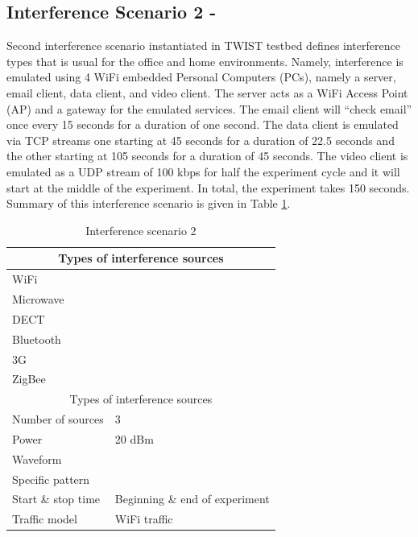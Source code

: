 \documentclass[11pt,a4paper,headinclude,footinclude,chapterprefix=on]{scrreprt}
\begin{document}
\subsection{Interference Scenario 2 - }\label{scene:int:2} Second interference scenario instantiated in TWIST testbed defines interference types that is usual for the office and home environments. Namely, interference is emulated using 4 WiFi embedded Personal Computers (PCs), namely a server, email client, data client, and video client. The server acts as a WiFi Access Point (AP) and a gateway for the emulated services. The email client will “check email” once every 15 seconds for a duration of one second. The data client is emulated via TCP streams one starting at 45 seconds for a duration of 22.5 seconds and the other starting at 105 seconds for a duration of 45 seconds. The video client is emulated as a UDP stream of 100 kbps for half the experiment cycle and it will start at the middle of the experiment. In total, the experiment takes 150 seconds. Summary of this interference scenario is given in Table \ref{tb:interf:3}. 
\begin{table}
	[h] \centering \caption{Interference scenario 2} \label{tb:interf:3} 
	\begin{tabular}
		{|l|l|} \hline \multicolumn{2}{|c|}{Types of interference sources} \\
		\hline WiFi & \checkmark \\
		Microwave & \texttimes \\
		DECT & \texttimes \\
		Bluetooth & \texttimes \\
		3G & \texttimes \\
		ZigBee & \texttimes \\
		\hline \multicolumn{2}{|c|}{Types of interference sources} \\
		\hline Number of sources & 3 \\
		Power & 20 dBm \\
		Waveform & \\
		Specific pattern & \\
		Start \& stop time & Beginning \& end of experiment \\
		Traffic model & WiFi traffic \\
		\hline 
	\end{tabular}
\end{table}

\end{document}
